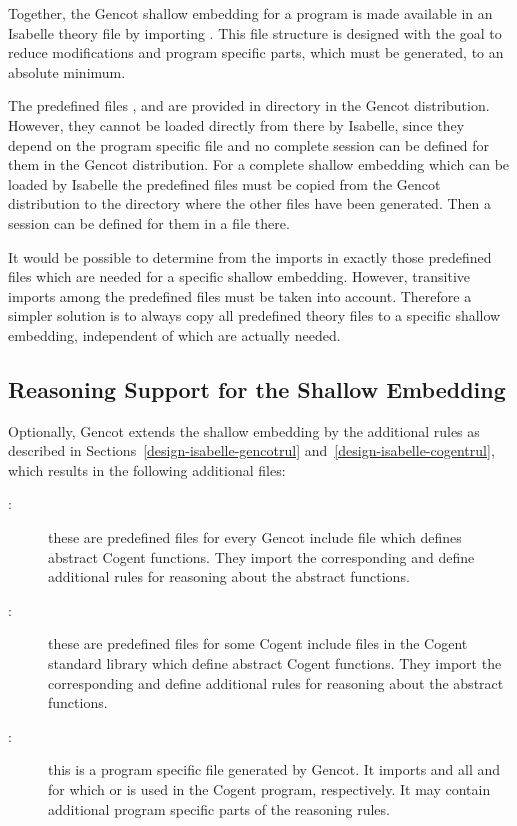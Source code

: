 Together, the Gencot shallow embedding for a program  is made available in an Isabelle theory file by importing
. This file structure is designed with the goal to reduce modifications and program 
specific parts, which must be generated, to an absolute minimum.

The predefined files ,  and  are provided in 
directory  in the Gencot distribution. However, they cannot be loaded directly from there by Isabelle, 
since they depend on the program specific file  and no complete session can be defined for 
them in the Gencot distribution. For a complete shallow embedding which can be loaded by Isabelle the predefined
files must be copied from the Gencot distribution to the directory where the other files have been generated. Then 
a session can be defined for them in a  file there.

It would be possible to determine from the imports in  exactly those predefined
files which are needed for a specific shallow embedding. However, transitive imports among the predefined files
must be taken into account. Therefore a simpler solution is to always copy all predefined theory files to a 
specific shallow embedding, independent of which are actually needed.

\subsection{Reasoning Support for the Shallow Embedding}
\label{impl-isabelle-rules}

Optionally, Gencot extends the shallow embedding by the additional rules as described in Sections~\ref{design-isabelle-gencotrul}
and~\ref{design-isabelle-cogentrul}, which results in the following additional files:
\begin{description}
\item[:] these are predefined files for every Gencot include file  which defines
abstract Cogent functions. They import the corresponding  and define additional rules for reasoning
about the abstract functions.
\item[:] these are predefined files for some Cogent include files  in the 
Cogent standard library  which define abstract Cogent functions. They import the corresponding 
 and define additional rules for reasoning about the abstract functions.
\item[:] this is a program specific file generated by Gencot. It imports 
 and all  and  
for which  or  is used in the Cogent program, respectively. It may contain additional 
program specific parts of the reasoning rules. 
\end{description}

